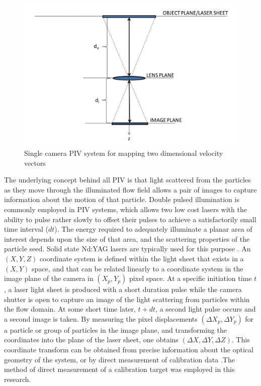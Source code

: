 \vspace{30pt}
\begin{figure}[H]
	\centering
	\includegraphics[width=5in]{figs/piv_method/mono_piv_optics}
	\caption{Single camera PIV system for mapping two dimensional velocity 
		vectors}
	\label{fig:mono_piv}
\end{figure} 

The 
underlying concept behind all PIV is that light scattered from the particles as 
they move through the illuminated flow field allows a pair of images to capture 
information about the motion of that particle. Double pulsed illumination is 
commonly employed in PIV systems, which allows two low cost lasers with the 
ability to pulse rather slowly to offset their pulses to achieve a 
satisfactorily small time interval ($dt$). The energy required to adequately 
illuminate a planar area of interest depends upon the size of that area, and 
the scattering properties of the particle seed. Solid state Nd:YAG lasers are 
typically used for this purpose \cite{adrian2011}. An $(X, Y, Z)$ coordinate 
system is defined within the light sheet that exists in a $(X, Y)$ 
space, and that can be related linearly to a 
coordinate system in the image plane of the camera in $(X_p, Y_p)$ pixel space. 
At a specific initiation time $t$, a laser light sheet is produced with a short 
duration pulse while the camera shutter is open to 
capture an image of the light scattering from particles within the flow domain. 
At some short time later, $t + dt$, a second light pulse occurs and a second 
image is taken. By measuring the pixel displacements $(\Delta X_p, \Delta 
Y_p)$ for a particle or group of particles in the image plane, and transforming 
the coordinates into the plane of the laser sheet, one obtains $(\Delta X, 
\Delta Y, \Delta Z)$. This coordinate transform can be obtained from precise 
information about the optical geometry of the system, or by direct measurement 
of calibration data \cite{fouras2007}.The method of direct measurement of a 
calibration target was employed in this research. 

